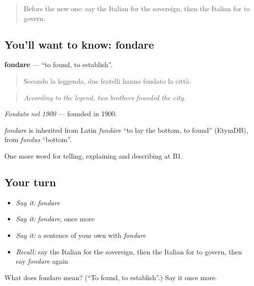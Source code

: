 \label{lesson:IT-C328-fondare}



\begin{quote}
Before the new one: say the Italian for the sovereign, then the Italian for to govern.
\end{quote}

\subsection*{You'll want to know: fondare}
\textbf{fondare} — \textquotedblleft{}to found, to establish\textquotedblright{}.

\begin{quote}
Secondo la leggenda, due fratelli hanno fondato la città.
\end{quote}

\begin{quote}
\emph{According to the legend, two brothers founded the city.}
\end{quote}

\emph{Fondato nel 1900} — founded in 1900.

\begin{cousinweb}
\emph{fondare} is inherited from Latin \emph{fundāre} \textquotedblleft{}to lay the bottom, to found\textquotedblright{} (EtymDB), from \emph{fundus} \textquotedblleft{}bottom\textquotedblright{}.
\end{cousinweb}

\begin{grammarlens}[title={What you've built}]
One more word for telling, explaining and describing at B1.
\end{grammarlens}

\subsection*{Your turn}
\begin{itemize}
\raggedright
  \item \emph{Say it:} \emph{fondare}
  \item \emph{Say it:} \emph{fondare}, once more
  \item \emph{Say it:} a sentence of your own with \emph{fondare}
  \item \emph{Recall:} say the Italian for the sovereign, then the Italian for to govern, then say \emph{fondare} again
\end{itemize}

\begin{tcolorbox}[breakable,colback=teal!4,colframe=teal!35!black,title={Before you move on}]
What does fondare mean? (\textquotedblleft{}To found, to establish\textquotedblright{}.) Say it once more.
\end{tcolorbox}
